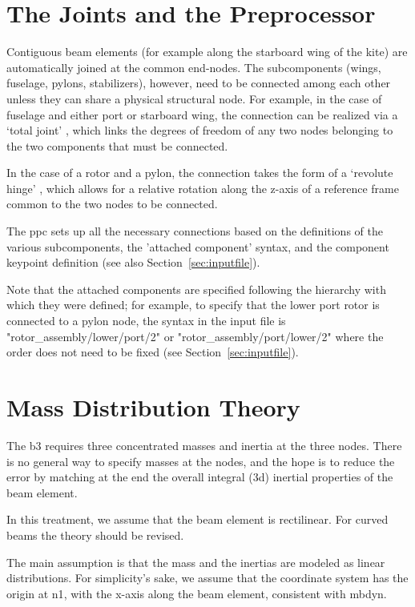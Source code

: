 \documentclass[report]{nrel}
\begin{document}
\section{The Joints and the Preprocessor}\label{sec:joints}
Contiguous beam elements (for example along the starboard wing of the kite) are automatically joined at the common end-nodes. The subcomponents (wings, fuselage, pylons, stabilizers), however, need to be connected among each other unless they can share a physical structural node. For example, in the case of fuselage and either port or starboard wing, the connection can be realized via a `total joint' \citep{masarati2017}, which links the degrees of freedom of any two nodes belonging to the two components that must be connected.

In the case of a rotor and a pylon, the connection takes the form of a `revolute hinge' \citep{masarati2017}, which allows for a relative rotation along the z-axis of a reference frame common to the two nodes to be connected.
 
The \gls{ppc} sets up all the necessary connections based on the definitions of the various subcomponents,  the 'attached component' syntax, and the component keypoint definition (see also Section~\ref{sec:inputfile}). 

Note that the attached components are specified following the hierarchy with which they were defined; for example, to specify that the lower port rotor is connected to a pylon node, the syntax in the input file is "rotor\_assembly/lower/port/2" or "rotor\_assembly/port/lower/2" where the order does not need to be fixed (see Section~\ref{sec:inputfile}). 

\section{Mass Distribution Theory}\label{sec:massdist}
The \gls{b3} requires three concentrated masses and inertia at the three nodes. There is no general way to specify masses at the nodes, and the hope is to reduce the error by matching at the end the overall integral (\gls{3d}) inertial properties of the beam element. 

In this treatment, we assume that the beam element is rectilinear. For curved beams the theory should be revised.

The main assumption is that the mass and the inertias are modeled as linear distributions.
For simplicity's sake, we assume that the coordinate system has the origin at \gls{n1}, with the x-axis along the beam element, consistent with \gls{mbdyn}.
\end{document}
